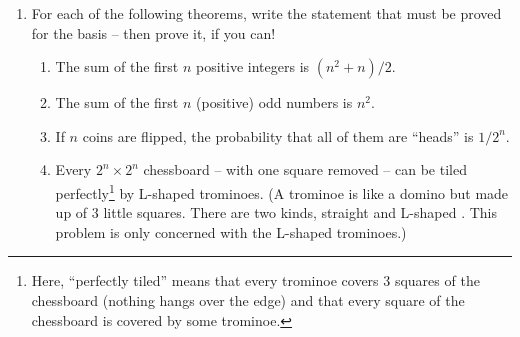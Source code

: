 \begin{enumerate}
\begin{proof}
\end{proof}
\medskip
   

\wbvfill

\workbookpagebreak
\hintspagebreak

\item For each of the following theorems, write the statement that must be
proved for the basis -- then prove it, if you can!

\begin{enumerate}
\item The sum of the first $n$ positive integers is $(n^2+n)/2$.


\wbvfill

\item The sum of the first $n$ (positive) odd numbers is $n^2$.


\wbvfill

\item If $n$ coins are flipped, the probability that all of them 
are ``heads'' is $1/2^n$.


\wbvfill

\item Every $2^n \times 2^n$ chessboard -- with one square removed -- can 
be tiled perfectly\footnote{Here, ``perfectly tiled'' means that every trominoe
covers 3 squares of the chessboard (nothing hangs over the edge) and that every
square of the chessboard is covered by some trominoe.} by L-shaped trominoes.  
(A trominoe is like a domino but 
made up of $3$ little squares.  There are two kinds, straight 
 and L-shaped 
. This problem is only concerned with
the L-shaped trominoes.)
\end{enumerate}


\end{enumerate}

